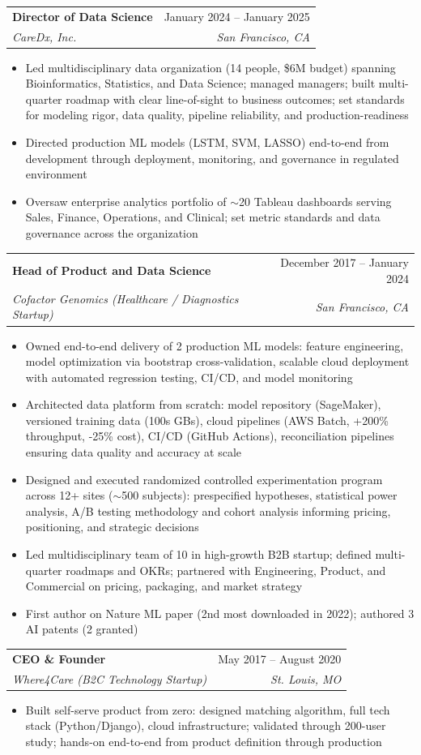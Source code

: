 \documentclass[letterpaper,11pt]{article}
\makeatletter
\newcommand{\resumeItem}[1]{
  \item\small{
    {#1 \vspace{-2pt}}
  }
}
\newcommand{\resumeSubheading}[4]{
  \vspace{-2pt}\item
    \begin{tabular*}{0.97\textwidth}[t]{l@{\extracolsep{\fill}}r}
      \textbf{#1} & #2 \\
      \textit{\small#3} & \textit{\small #4} \\
    \end{tabular*}\vspace{-7pt}
}
\newcommand{\resumeItemListStart}{\begin{itemize}}
\newcommand{\resumeItemListEnd}{\end{itemize}\vspace{-5pt}}
\makeatother
\begin{document}
    \resumeSubheading
      {Director of Data Science}{January 2024 -- January 2025}
      {CareDx, Inc.}{San Francisco, CA}
      \resumeItemListStart
        \resumeItem{Led multidisciplinary data organization (14 people, \$6M budget) spanning Bioinformatics, Statistics, and Data Science; managed managers; built multi-quarter roadmap with clear line-of-sight to business outcomes; set standards for modeling rigor, data quality, pipeline reliability, and production-readiness}
        \resumeItem{Directed production ML models (LSTM, SVM, LASSO) end-to-end from development through deployment, monitoring, and governance in regulated environment}
        \resumeItem{Oversaw enterprise analytics portfolio of $\sim$20 Tableau dashboards serving Sales, Finance, Operations, and Clinical; set metric standards and data governance across the organization}
      \resumeItemListEnd

    \resumeSubheading
      {Head of Product and Data Science}{December 2017 -- January 2024}
      {Cofactor Genomics (Healthcare / Diagnostics Startup)}{San Francisco, CA}
      \resumeItemListStart
        \resumeItem{Owned end-to-end delivery of 2 production ML models: feature engineering, model optimization via bootstrap cross-validation, scalable cloud deployment with automated regression testing, CI/CD, and model monitoring}
        \resumeItem{Architected data platform from scratch: model repository (SageMaker), versioned training data (100s GBs), cloud pipelines (AWS Batch, +200\% throughput, -25\% cost), CI/CD (GitHub Actions), reconciliation pipelines ensuring data quality and accuracy at scale}
        \resumeItem{Designed and executed randomized controlled experimentation program across 12+ sites ($\sim$500 subjects): prespecified hypotheses, statistical power analysis, A/B testing methodology and cohort analysis informing pricing, positioning, and strategic decisions}
        \resumeItem{Led multidisciplinary team of 10 in high-growth B2B startup; defined multi-quarter roadmaps and OKRs; partnered with Engineering, Product, and Commercial on pricing, packaging, and market strategy}
        \resumeItem{First author on Nature ML paper (2nd most downloaded in 2022); authored 3 AI patents (2 granted)}
      \resumeItemListEnd

    \resumeSubheading
      {CEO \& Founder}{May 2017 -- August 2020}
      {Where4Care (B2C Technology Startup)}{St. Louis, MO}
      \resumeItemListStart
        \resumeItem{Built self-serve product from zero: designed matching algorithm, full tech stack (Python/Django), cloud infrastructure; validated through 200-user study; hands-on end-to-end from product definition through production}
      \resumeItemListEnd
\end{document}
